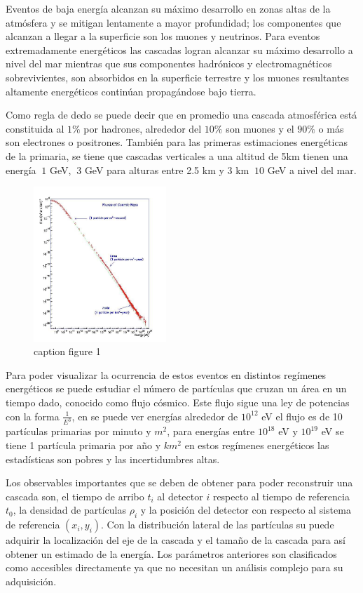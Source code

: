Eventos de baja energía alcanzan su máximo desarrollo en zonas altas de la atmósfera y se mitigan lentamente a mayor profundidad; los componentes que alcanzan a llegar a la superficie son los muones y neutrinos. Para eventos extremadamente energéticos las cascadas logran alcanzar su máximo desarrollo a nivel del mar mientras que sus componentes hadrónicos y electromagnéticos sobrevivientes, son absorbidos en la superficie terrestre y los muones resultantes altamente energéticos continúan propagándose bajo tierra. 

Como regla de dedo se puede decir que en promedio una cascada atmosférica está constituida al $1\%$ por hadrones, alrededor del $10\%$ son muones y el $90\%$ o más son electrones o positrones. También para las primeras estimaciones energéticas de la primaria, se tiene que cascadas verticales a una altitud de 5km tienen una energía $~1$ GeV, $~3$ GeV para alturas entre 2.5 km y 3 km $~10$ GeV a nivel del mar.

\begin{figure}
    \centering
    \includegraphics[width=50mm,scale=0.5]{Figures/All-particle-cosmic-rays-energy-spectrum.jpg}
    \decoRule
    \caption[energyspectrum]{caption figure 1}
    \label{fig:energyspectrum}
\end{figure}

Para poder visualizar la ocurrencia de estos eventos en distintos regímenes energéticos se puede estudiar el número de partículas que cruzan un área en un tiempo dado, conocido como flujo cósmico. Este flujo sigue una ley de potencias con la forma $\frac{1}{E^3}$, en se puede ver  energías alrededor de $10^12$ eV el flujo es de 10 partículas primarias por minuto y $m^2$, para energías entre $10^18$ eV y $10^19$ eV se tiene 1 partícula primaria por año y $km^2$ en estos regímenes energéticos las estadísticas son pobres y las incertidumbres altas. 

Los observables importantes que se deben de obtener para poder reconstruir una cascada son, el tiempo de arribo $t_i$ al detector $i$ respecto al tiempo de referencia $t_0$, la densidad de partículas $\rho_i$ y la posición del detector con respecto al sistema de referencia $(x_i, y_i)$.
Con la distribución lateral de las partículas su puede adquirir la localización del eje de la cascada y el tamaño de la cascada para así obtener un estimado de la energía. Los parámetros anteriores son clasificados como accesibles directamente ya que no necesitan un análisis complejo para su adquisición. 

